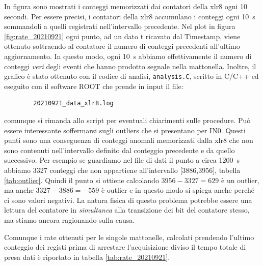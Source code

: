 \documentclass[11pt,a4paper]{article}
\begin{document}
In figura sono mostrati i conteggi memorizzati dai contatori della xlr8 ogni 10 secondi. Per essere precisi, i contatori della xlr8 accumulano i conteggi ogni \SI{10}{s} sommandoli a quelli registrati nell'intervallo precedente. Nel plot in figura \ref{fig:rate_20210921} ogni punto, ad un dato t ricavato dal Timestamp, viene ottenuto sottraendo al contatore il numero di conteggi precedenti all'ultimo aggiornamento. In questo modo, ogni \SI{10}{s} abbiamo effettivamente il numero di conteggi \textit{veri} degli eventi che hanno prodotto segnale nella mattonella. Inoltre, il grafico è stato ottenuto con il codice di analisi, \verb|analysis.C|, scritto in C/C++ ed eseguito con il software ROOT che prende in input il file:
\begin{verbatim}
        20210921_data_xlr8.log
\end{verbatim}
comunque si rimanda allo script per eventuali chiarimenti sulle procedure.
Può essere interessante soffermarsi sugli outliers che si presentano per IN0. Questi punti sono una conseguenza di conteggi anomali memorizzati dalla xlr8 che non sono contenuti nell'intervallo definito dal conteggio precedente e da quello successivo. Per esempio se guardiamo nel file di dati il punto a circa \SI{1200}{s} abbiamo 3327 conteggi che non appartiene all'intervallo [3886,3956], tabella \ref{tab:outlier}. Quindi il punto si ottiene calcolando $3956-3327=629$ è un outlier, ma anche $3327-3886=-559$ è outlier e in questo modo si spiega anche perché ci sono valori negativi. La natura fisica di questo problema potrebbe essere una lettura del contatore in \textit{simultanea} alla transizione dei bit del contatore stesso, ma stiamo ancora ragionando sulla causa.
\begin{table}
    \centering
    
\end{table}

Comunque i rate ottenuti per le singole mattonelle, calcolati prendendo l'ultimo conteggio dei registi prima di arrestare l'acquisizione diviso il tempo totale di presa dati è riportato in tabella \ref{tab:rate_20210921}.
\end{document}
